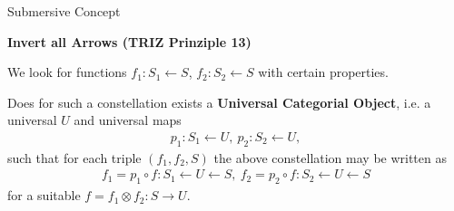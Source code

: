 \documentclass{beamer}
\newcommand{\ueberschrift}[1]{\begin{center}\bf #1\end{center}}
\begin{document}
\begin{frame}{Submersive Concept}

\ueberschrift{Invert all Arrows (TRIZ Prinziple 13)}
\small
We look for functions $f_1: S_1 \leftarrow S$, $f_2: S_2 \leftarrow S$ with
certain properties.

Does for such a constellation exists a \textbf{Universal Categorial Object},
i.e. a universal $U$ and universal maps
\begin{gather*}
  p_1: S_1 \leftarrow U,\ p_2: S_2 \leftarrow U,
\end{gather*}
such that for each triple $(f_1, f_2, S)$ the above constellation may be
written as
\begin{gather*}
  f_1 = p_1 \circ f: S_1 \leftarrow U \leftarrow S,\ f_2 = p_2 \circ f : S_2
  \leftarrow U \leftarrow S
\end{gather*}
for a suitable $f = f_1 \otimes f_2: S \rightarrow U$. 

\end{frame}
\end{document}
